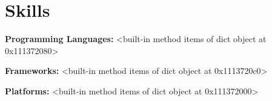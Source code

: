\section{Skills}

    \begin{onecolentry}
        \textbf{Programming Languages:} <built-in method items of dict object at 0x111372080>
    \end{onecolentry}

    \vspace{0.05 cm}

    \begin{onecolentry}
        \textbf{Frameworks:} <built-in method items of dict object at 0x1113720c0>
    \end{onecolentry}

    \vspace{0.05 cm}

    \begin{onecolentry}
        \textbf{Platforms:} <built-in method items of dict object at 0x111372000>
    \end{onecolentry}

    \vspace{0.05 cm}

